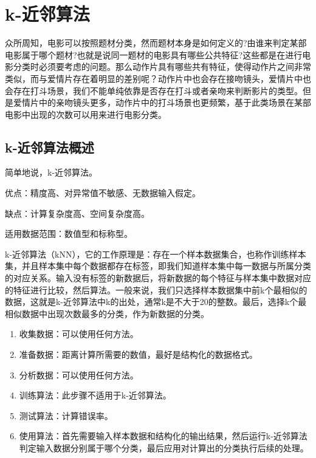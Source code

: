 \chapter{k-近邻算法}
众所周知，电影可以按照题材分类，然而题材本身是如何定义的?由谁来判定某部电影属于哪个题材?也就是说同一题材的电影具有哪些公共特征?这些都是在进行电影分类时必须要考虑的问题。那么动作片具有哪些共有特征，使得动作片之间非常类似，而与爱情片存在着明显的差别呢？动作片中也会存在接吻镜头，爱情片中也会存在打斗场景，我们不能单纯依靠是否存在打斗或者亲吻来判断影片的类型。但是爱情片中的亲吻镜头更多，动作片中的打斗场景也更频繁，基于此类场景在某部电影中出现的次数可以用来进行电影分类。

\section{k-近邻算法概述}
简单地说，k-近邻算法。

\begin{tcolorbox}[title=k-近邻算法]
    优点：精度高、对异常值不敏感、无数据输入假定。

    缺点：计算复杂度高、空间复杂度高。

    适用数据范围：数值型和标称型。
\end{tcolorbox}

k-近邻算法（kNN），它的工作原理是：存在一个样本数据集合，也称作训练样本集，并且样本集中每个数据都存在标签，即我们知道样本集中每一数据与所属分类的对应关系。输入没有标签的新数据后，将新数据的每个特征与样本集中数据对应的特征进行比较，然后算法。一般来说，我们只选择样本数据集中前k个最相似的数据，这就是k-近邻算法中k的出处，通常k是不大于20的整数。最后，选择k个最相似数据中出现次数最多的分类，作为新数据的分类。


\begin{tcolorbox}[title=k-近邻算法的一般流程]
    \begin{enumerate}
        \item 收集数据：可以使用任何方法。
        \item 准备数据：距离计算所需要的数值，最好是结构化的数据格式。
        \item 分析数据：可以使用任何方法。
        \item 训练算法：此步骤不适用于k-近邻算法。
        \item 测试算法：计算错误率。
        \item 使用算法：首先需要输入样本数据和结构化的输出结果，然后运行k-近邻算法判定输入数据分别属于哪个分类，最后应用对计算出的分类执行后续的处理。
    \end{enumerate}
\end{tcolorbox}

